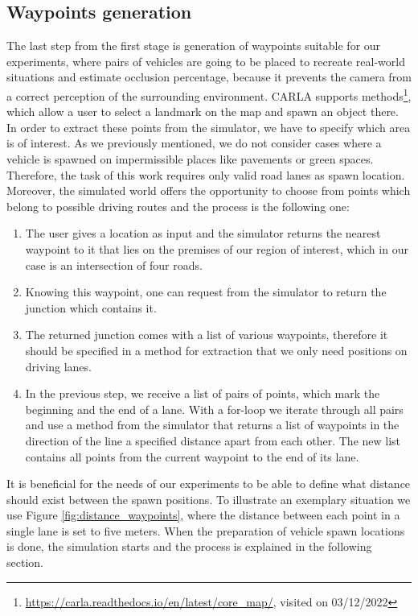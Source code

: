 \subsection{Waypoints generation}
The last step from the first stage is generation of waypoints suitable for our experiments, where pairs of vehicles are going to be placed to recreate real-world situations and estimate occlusion percentage, because it prevents the camera from a correct perception of the surrounding environment. CARLA supports methods\footnote{\url{https://carla.readthedocs.io/en/latest/core_map/}, visited on 03/12/2022}, which allow a user to select a landmark on the map and spawn an object there. In order to extract these points from the simulator, we have to specify which area is of interest. As we previously mentioned, we do not consider cases where a vehicle is spawned on impermissible places like pavements or green spaces. Therefore, the task of this work requires only valid road lanes as spawn location. Moreover, the simulated world offers the opportunity to choose from points which belong to possible driving routes and the process is the following one:
\begin{enumerate}
    \item The user gives a location as input and the simulator returns the nearest waypoint to it that lies on the premises of our region of interest, which in our case is an intersection of four roads.
    \item Knowing this waypoint, one can request from the simulator to return the junction which contains it.
    \item The returned junction comes with a list of various waypoints, therefore it should be specified in a method for extraction that we only need positions on driving lanes.
    \item In the previous step, we receive a list of pairs of points, which mark the beginning and the end of a lane. With a for-loop we iterate through all pairs and use a method from the simulator that returns a list of waypoints in the direction of the line a specified distance apart from each other. The new list contains all points from the current waypoint to the end of its lane.
\end{enumerate}
It is beneficial for the needs of our experiments to be able to define what distance should exist between the spawn positions. To illustrate an exemplary situation we use Figure \ref{fig:distance_waypoints}, where the distance between each point in a single lane is set to five meters. When the preparation of vehicle spawn locations is done, the simulation starts and the process is explained in the following section.


